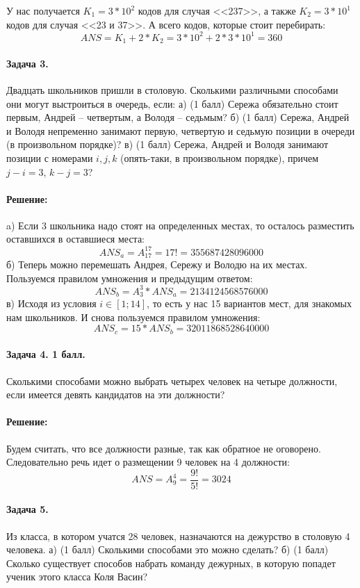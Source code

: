 \documentclass[12pt]{article}
\begin{document}
У нас получается $ K_1 = 3 * 10^2 $ кодов для случая <<237>>, а также
$ K_2 = 3 * 10^1 $ кодов для случая <<23 и 37>>. А всего кодов, которые
стоит перебирать:
$$ ANS = K_1 + 2 * K_2 = 3 * 10^2 + 2 * 3 * 10^1 = 360 $$



\paragraph{Задача 3.} Двадцать школьников пришли в столовую. 
Сколькими различными способами они могут выстроиться в очередь, если:
а) (1 балл) Сережа обязательно стоит первым, Андрей -- четвертым, а Володя -- 
седьмым? б) (1 балл) Сережа, Андрей и Володя непременно
занимают первую, четвертую и седьмую позиции в очереди (в произвольном
порядке)? в) (1 балл) Сережа, Андрей и Володя занимают позиции с номерами 
$ i,j,k $ (опять-таки, в произвольном порядке), причем 
$ j-i = 3 $, $ k-j=3 $? 

\paragraph{\bf Решение:}
a) Если 3 школьника надо стоят на определенных местах, то осталось разместить
оставшихся в оставшиеся места:
$$ ANS_a = A_{17}^{17} = 17! = 355687428096000 $$
б) Теперь можно перемешать Андрея, Сережу и Володю на их местах. 
Пользуемся правилом умножения и предыдущим ответом:
$$ ANS_b = A_{3}^{3} * ANS_a = 2134124568576000 $$
в) Исходя из условия $ i \in [1; 14] $, то есть у нас 15 вариантов мест, для
знакомых нам школьников. И снова пользуемся правилом умножения:
$$ ANS_c = 15 * ANS_b = 32011868528640000 $$



\paragraph{Задача 4. 1 балл.} Сколькими способами можно выбрать четырех 
человек на четыре должности, если имеется девять кандидатов на эти 
должности? 

\paragraph{\bf Решение:}
Будем считать, что все должности разные, так как обратное не оговорено. Следовательно
речь идет о размещении 9 человек на 4 должности:
$$ ANS = A_{9}^{4} = \frac{9!}{5!} = 3024 $$


\paragraph{Задача 5.} Из класса, в котором учатся 28 человек, 
назначаются на дежурство в столовую 4 человека. а) (1 балл) Сколькими способами 
это можно сделать? б) (1 балл) Сколько существует способов набрать команду 
дежурных, в которую попадет ученик этого класса Коля Васин?
\end{document}
